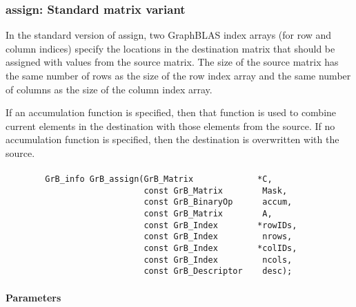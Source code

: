 \subsubsection{{\sf assign}: Standard matrix variant}

In the standard version of {\sf assign}, two GraphBLAS index arrays (for row and
column indices) specify the locations in the destination matrix that should be 
assigned with values from the source matrix.  The size of the source matrix has the same
number of rows as the size of the row index array and the same number
of columns as the size of the column index array.

If an accumulation function is specified, then that function is used
to combine current elements in the destination with those elements
from the source.  If no accumulation function is specified, then the
destination is overwritten with the source.

\paragraph{\syntax}

\begin{verbatim}
        GrB_info GrB_assign(GrB_Matrix             *C,
                            const GrB_Matrix        Mask,
                            const GrB_BinaryOp      accum,
                            const GrB_Matrix        A,
                            const GrB_Index        *rowIDs,
                            const GrB_Index         nrows,
                            const GrB_Index        *colIDs,
                            const GrB_Index         ncols,
                            const GrB_Descriptor    desc);
\end{verbatim}

\paragraph{Parameters}

